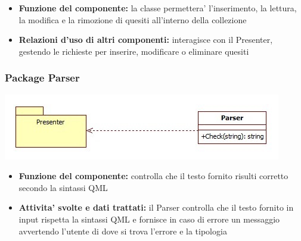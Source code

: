 			\begin{itemize}
		    	\item\textbf{Funzione del componente:} la classe permettera' l'inserimento, la lettura, la modifica e la rimozione di quesiti all'interno della collezione
			\item\textbf{Relazioni d'uso di altri componenti:} interagisce con il Presenter, gestendo le richieste per inserire, modificare o eliminare quesiti
			\end{itemize}
			
			\subsubsection{Package Parser}
			\begin{center}
				\includegraphics[scale=0.6]{../images/Parser.jpg}
			\end{center}
 			\begin{itemize}
		    	\item\textbf{Funzione del componente:} controlla che il testo fornito risulti corretto secondo la sintassi QML
			\item\textbf{Attivita' svolte e dati trattati:} il Parser controlla che il testo fornito in input rispetta la sintassi QML e fornisce in caso di errore un messaggio avvertendo l'utente di dove si trova l'errore e la tipologia
			\end{itemize}
			

